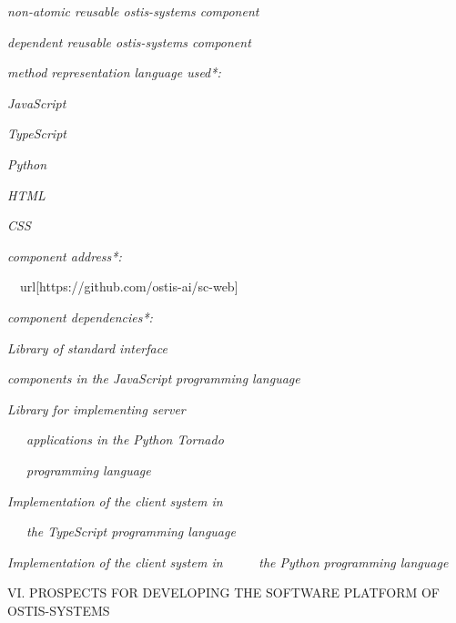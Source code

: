 \documentclass{article}
\begin{document}
\begin{multicols}{2}
\begin{description}[ labelwidth=0.75cm]
\begin{description}[ labelwidth=0.75cm]
\item [$\in$] \textit{non-atomic reusable ostis-systems component}

 \item [$\in$] \textit{dependent reusable ostis-systems component}

 \item [$\Rightarrow$] \textit{method representation language used*:}
\begin{description}[ labelwidth=0.75cm]
\item [•] \textit{JavaScript}
\item [•] \textit{TypeScript}
\item [•] \textit{Python}
\item [•] \textit{HTML}
\item [•] \textit{CSS}
\end{description}

\item [$\Rightarrow$] \textit{component address*:}

\ \ url{[https://github.com/ostis-ai/sc-web]}
\columnbreak

\item [$\Rightarrow$] \textit{component dependencies*:
}

 \begin{description}[ labelwidth=0.75cm]
 \vspace{-0.15cm}
 \item[\{•] \textit{Library of standard interface}\par
 \hspace{0.2cm }\textit{components in the JavaScript}
 \textit{programming language}
\item[\ •] \textit{Library for implementing server}\par
 \ \ \  \textit{applications in the Python Tornado}\par
 \ \ \  \textit{programming language}
 \item[\ •] \textit{Implementation of the client system in}\par
 \ \ \  \textit{the TypeScript programming language}
  \item[\ •] \textit{Implementation of the client system in}
   \ \ \ \ \ \textit{the Python programming language}
\item[\}]
\end{description} 

\end{description}

\begin{center}
\small{VI. PROSPECTS FOR DEVELOPING THE SOFTWARE
PLATFORM OF OSTIS-SYSTEMS}
\end{center}


\end{description}
\end{multicols}
\end{document}
